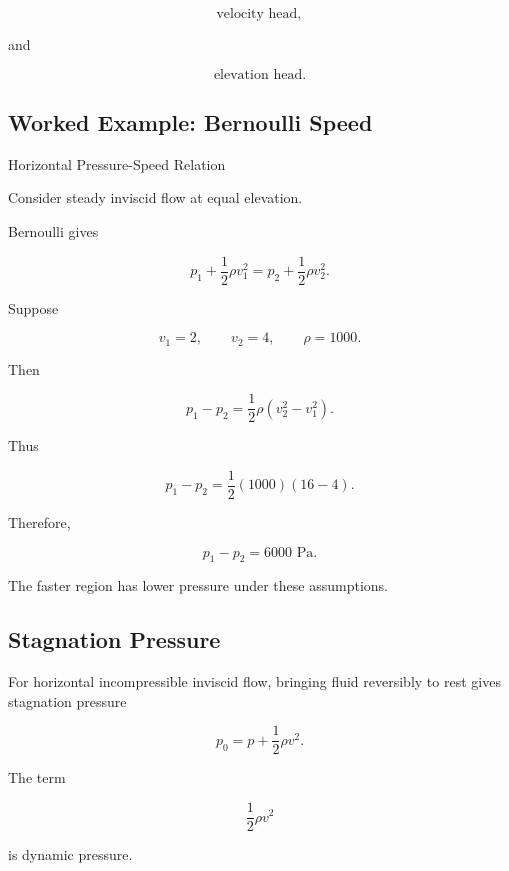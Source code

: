 \[
\boxed{
\text{velocity head},
}
\]

and

\[
\boxed{
\text{elevation head}.
}
\]

\subsection{Worked Example: Bernoulli Speed}
\label{subsec:worked-bernoulli-speed}

\begin{workedexamplebox}{Horizontal Pressure-Speed Relation}

Consider steady inviscid flow at equal elevation.

Bernoulli gives

\[
p_1
+
\frac12\rho v_1^2
=
p_2
+
\frac12\rho v_2^2.
\]

Suppose

\[
v_1=2,
\qquad
v_2=4,
\qquad
\rho=1000.
\]

Then

\[
p_1-p_2
=
\frac12\rho
(v_2^2-v_1^2).
\]

Thus

\[
p_1-p_2
=
\frac12(1000)(16-4).
\]

Therefore,

\begin{answerbox}
\[
\boxed{
p_1-p_2
=
6000\text{ Pa}.
}
\]
\end{answerbox}

The faster region has lower pressure under these assumptions.

\end{workedexamplebox}

\subsection{Stagnation Pressure}
\label{subsec:stagnation-pressure}

For horizontal incompressible inviscid flow, bringing fluid reversibly to
rest gives stagnation pressure

\[
\boxed{
p_0
=
p
+
\frac12\rho v^2.
}
\]

The term

\[
\frac12\rho v^2
\]

is dynamic pressure.

